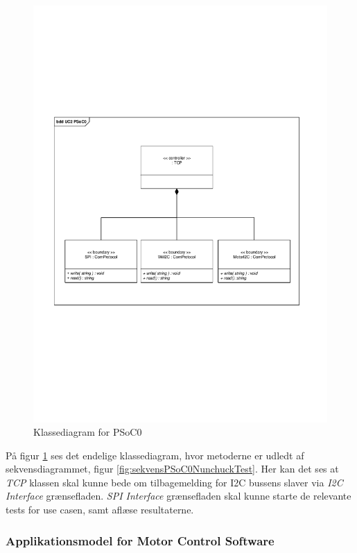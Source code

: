 \begin{figure}[H]
	\centering
	\includegraphics[width=\textwidth]{Systemarkitektur/images/klassediagramPSoC0}
	\caption{Klassediagram for PSoC0}
	\label{fig:klassePSoC0}
\end{figure}

På figur \ref{fig:klassePSoC0} ses det endelige klassediagram, hvor metoderne er udledt af sekvensdiagrammet, figur \ref{fig:sekvensPSoC0NunchuckTest}. Her kan det ses at \textit{TCP} klassen skal kunne bede om tilbagemelding for I2C bussens slaver via \textit{I2C Interface} grænsefladen. \textit{SPI Interface} grænsefladen skal kunne starte de relevante tests for use casen, samt aflæse resultaterne.

\subsubsection{Applikationsmodel for Motor Control Software}

